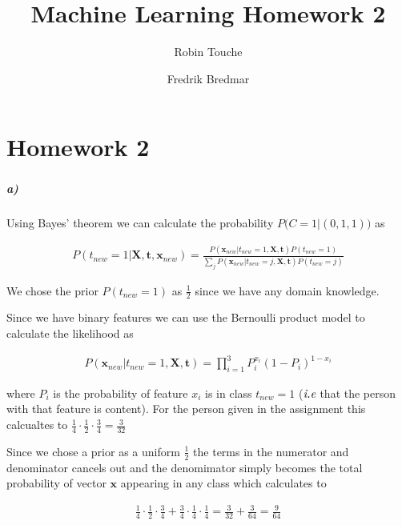 \documentclass{article}
\author{
  Robin Touche \\
  \and
  Fredrik Bredmar
}
\title{Machine Learning Homework 2}
\begin{document}
\maketitle

\chapter{Homework 2}
\setcounter{section}{1}
\subsection{}
\paragraph{a)}

Using Bayes' theorem we can calculate the probability $P\big(C = 1 \vert (0, 1, 1)\big)$ as

\begin{align}
  P\left( t_{new} = 1 \vert \mathbf{X}, \mathbf{t}, \mathbf{x}_{new} \right)
  = \frac{P \left( \mathbf{x}_{new} \vert t_{new} = 1, \mathbf{X}, \mathbf{t} \right) P \left( t_{new} = 1 \right)}{ \sum_j P \left( \mathbf{x}_{new} \vert t_{new} = j, \mathbf{X}, \mathbf{t} \right) P \left( t_{new} = j \right) }
\end{align}

We chose the prior $P ( t_{new} = 1 )$ as $\frac{1}{2}$ since we have any
domain knowledge.

Since we have binary features we can use the Bernoulli product model to
calculate the likelihood as

\begin{align}
  P \left( \mathbf{x}_{new} \vert t_{new} = 1, \mathbf{X}, \mathbf{t} \right) = \prod_{i = 1}^{3} P_i^{x_i} \left( 1 - P_i \right)^{1 - x_i}
\end{align}

where $P_i$ is the probability of feature $x_i$ is in class $t_{new} = 1$
($\emph{i.e}$ that the person with that feature is content).  For the person
given in the assignment this calcualtes to $\frac{1}{4} \cdot \frac{1}{2} \cdot
\frac{3}{4} = \frac{3}{32}$

Since we chose a prior as a uniform $\frac{1}{2}$ the terms in the numerator
and denominator cancels out and the denomimator simply becomes the total
probability of vector $\mathbf{x}$ appearing in any class which calculates to

\begin{align}
  \frac{1}{4} \cdot \frac{1}{2} \cdot \frac{3}{4} + \frac{3}{4} \cdot \frac{1}{4} \cdot \frac{1}{4}  = \frac{3}{32} + \frac{3}{64} = \frac{9}{64}
\end{align}
\end{document}
